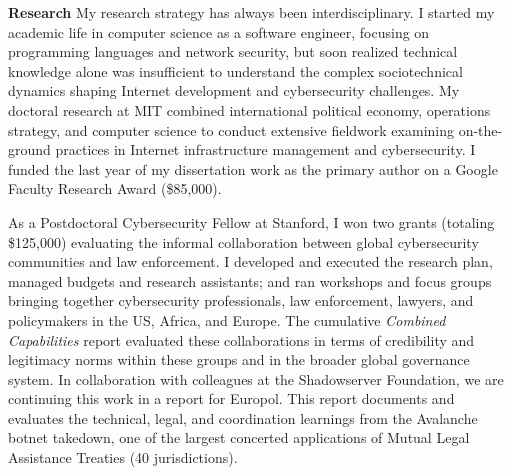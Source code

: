 \documentclass[11pt]{letter}
\begin{document}
\begin{letter}
\textbf{Research} \vspace{0.2 \baselineskip} \newline %
%
My research strategy has always been interdisciplinary. 
%
I started my academic life in computer science as a software engineer, focusing on programming languages and network security, but soon realized technical knowledge alone was insufficient to understand the complex sociotechnical dynamics shaping Internet development and cybersecurity challenges.
My doctoral research at MIT combined international political economy, operations strategy, and computer science to conduct extensive fieldwork examining on-the-ground practices in Internet infrastructure management and cybersecurity.
%
I funded the last year of my dissertation work as the primary author on a Google Faculty Research Award (\$85,000). 
%

As a Postdoctoral Cybersecurity Fellow at Stanford, I won two grants (totaling \$125,000) evaluating the informal collaboration between global  cybersecurity communities and law enforcement.
%
%
I developed and executed the research plan, managed budgets and research assistants; and ran workshops and focus groups bringing together cybersecurity professionals, law enforcement, lawyers, and policymakers in the US, Africa, and Europe.
%
The cumulative \emph{Combined Capabilities} report evaluated these collaborations in terms of credibility and legitimacy norms within these groups and in the broader global governance system.
%
In collaboration with colleagues at the Shadowserver Foundation, we are continuing this work in a report for Europol.
%
This report documents and evaluates the technical, legal, and coordination learnings from the Avalanche botnet takedown, one of the largest concerted applications of Mutual Legal Assistance Treaties (40 jurisdictions).


%


\end{letter}
\end{document}
